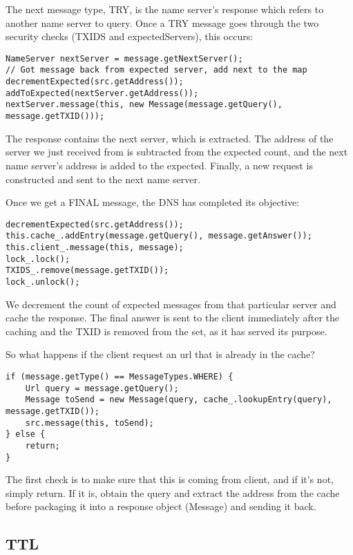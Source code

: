 \documentclass[a4paper, 12pt]{article} %
\begin{document}
The next message type, TRY, is the name server's response which refers to another name server to query. Once a TRY message goes through the two security checks (TXIDS and expectedServers), this occurs: 

\begin{lstlisting}
NameServer nextServer = message.getNextServer();
// Got message back from expected server, add next to the map 
decrementExpected(src.getAddress());
addToExpected(nextServer.getAddress());
nextServer.message(this, new Message(message.getQuery(), message.getTXID()));
\end{lstlisting}

The response contains the next server, which is extracted. The address of the server we just received from is subtracted from the expected count, and the next name server's address is added to the expected. Finally, a new request is constructed and sent to the next name server. 

Once we get a FINAL message, the DNS has completed its objective: 

\begin{lstlisting}
decrementExpected(src.getAddress());
this.cache_.addEntry(message.getQuery(), message.getAnswer());
this.client_.message(this, message);
lock_.lock();
TXIDS_.remove(message.getTXID());
lock_.unlock();	
\end{lstlisting}

We decrement the count of expected messages from that particular server and cache the response. The final answer is sent to the client immediately after the caching and the TXID is removed from the set, as it has served its purpose.

So what happens if the client request an url that is already in the cache?

\begin{lstlisting}
if (message.getType() == MessageTypes.WHERE) {
    Url query = message.getQuery();
    Message toSend = new Message(query, cache_.lookupEntry(query), message.getTXID());
    src.message(this, toSend);
} else {
    return;
}
\end{lstlisting}

The first check is to make sure that this is coming from  client, and if it's not, simply return. If it is, obtain the query and extract the address from the cache before packaging it into a response object (Message) and sending it back.

\subsection*{TTL}
\end{document}
